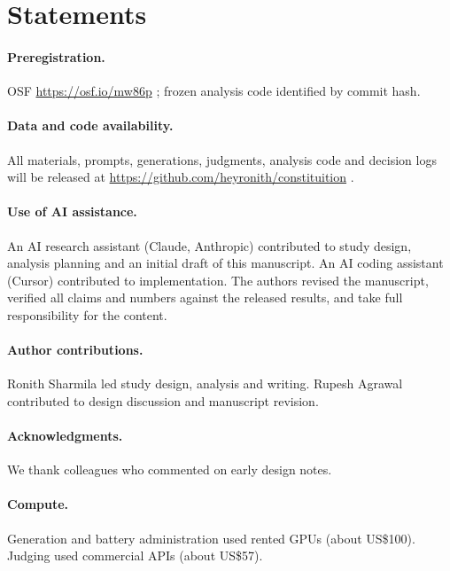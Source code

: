 \section*{Statements}
\label{sec:statements}

\paragraph{Preregistration.}
OSF
%
\else
\url{https://osf.io/mw86p}%
\fi
; frozen analysis code identified by commit hash.

\paragraph{Data and code availability.}
All materials, prompts, generations, judgments, analysis code and decision logs will be released
%
\else
at \url{https://github.com/heyronith/constituition}%
\fi
.

\paragraph{Use of AI assistance.}
An AI research assistant (Claude, Anthropic) contributed to study design, analysis planning and an initial draft of this manuscript. An AI coding assistant (Cursor) contributed to implementation. The authors revised the manuscript, verified all claims and numbers against the released results, and take full responsibility for the content.

\ifanon
\else
\paragraph{Author contributions.}
Ronith Sharmila led study design, analysis and writing. Rupesh Agrawal contributed to design discussion and manuscript revision.

\paragraph{Acknowledgments.}
We thank colleagues who commented on early design notes.
\fi

\paragraph{Compute.}
Generation and battery administration used rented GPUs (about US\$100). Judging used commercial APIs (about US\$57).
